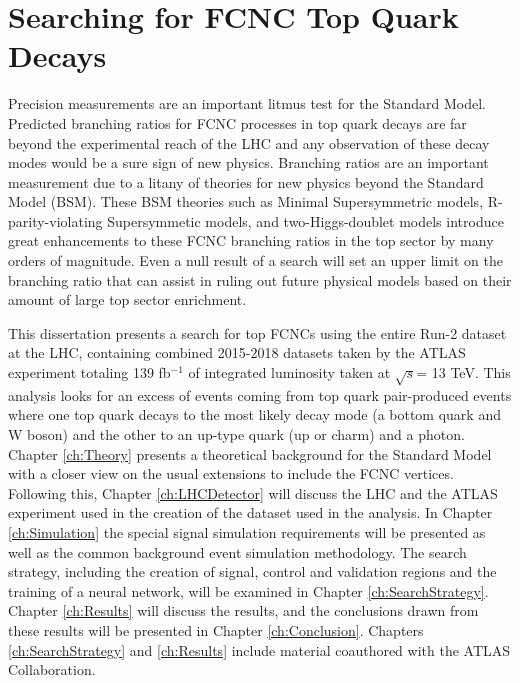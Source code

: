 \section{Searching for FCNC Top Quark Decays}
Precision measurements are an important litmus test for the Standard Model.  Predicted branching ratios for FCNC processes in top quark decays are far beyond the experimental reach of the LHC and any observation of these decay modes would be a sure sign of new physics.  Branching ratios are an important measurement due to a litany of theories for new physics beyond the Standard Model (BSM).  These BSM theories  such as Minimal Supersymmetric models\cite{MSSM}, R-parity-violating Supersymmetic models\cite{RPVSUSY}, and two-Higgs-doublet models\cite{2HDM} introduce great enhancements to these FCNC branching ratios in the top sector by many orders of magnitude.  Even a null result of a search will set an upper limit on the branching ratio that can assist in ruling out future physical models based on their amount of large top sector enrichment.

This dissertation presents a search for top FCNCs using the entire Run-2 dataset at the LHC, containing combined 2015-2018 datasets taken by the ATLAS experiment totaling 139 fb$^{-1}$ of integrated luminosity taken at $\sqrt{s}$= 13 TeV.  This analysis looks for an excess of events coming from top quark pair-produced events where one top quark decays to the most likely decay mode (a bottom quark and W boson) and the other to an up-type quark (up or charm) and a photon. Chapter \ref{ch:Theory} presents a theoretical background for the Standard Model with a closer view on the usual extensions to include the FCNC vertices.  Following this,  Chapter \ref{ch:LHCDetector} will discuss the LHC and the ATLAS experiment used in the creation of the dataset used in the analysis.  In Chapter \ref{ch:Simulation} the special signal simulation requirements will be presented as well as the common background event simulation methodology.  The search strategy, including the creation of signal, control and validation regions and the training of a neural network, will be examined in Chapter \ref{ch:SearchStrategy}.  Chapter \ref{ch:Results} will discuss the results, and the conclusions drawn from these results will be presented in Chapter \ref{ch:Conclusion}.  Chapters \ref{ch:SearchStrategy} and \ref{ch:Results} include material coauthored with the ATLAS Collaboration.